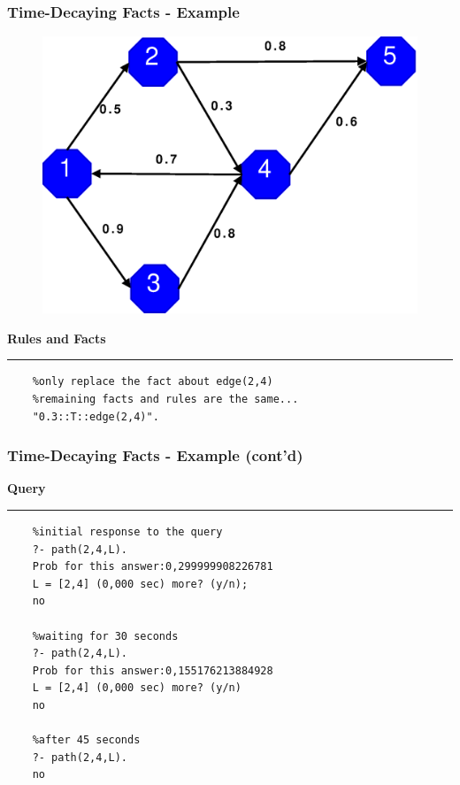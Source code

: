\documentclass{beamer}
\newenvironment{mylisting}
{\begin{list}{}{\setlength{\leftmargin}{1em}}\item\scriptsize\bfseries}
{\end{list}}
\begin{document}
\begin{frame}[fragile]
	\frametitle{Time-Decaying Facts - Example}
	\begin{figure}[ht]
	\begin{center}
	\includegraphics[height=.3\paperheight]{../img/graph.eps}
	\end{center}
	\end{figure}
	\begin{mylisting}
	Rules and Facts
	\vspace*{2px}\hrule
	\begin{verbatim}
	%only replace the fact about edge(2,4)
	%remaining facts and rules are the same...
	"0.3::T::edge(2,4)".
	\end{verbatim}
	\end{mylisting}
	
\end{frame}

\begin{frame}[fragile]
	\frametitle{Time-Decaying Facts - Example (cont'd)}
	\begin{mylisting}
	Query
	\vspace*{2px}\hrule
	\begin{verbatim}
	%initial response to the query
	?- path(2,4,L).
	Prob for this answer:0,299999908226781
	L = [2,4] (0,000 sec) more? (y/n);
	no
	
	%waiting for 30 seconds
	?- path(2,4,L).
	Prob for this answer:0,155176213884928
	L = [2,4] (0,000 sec) more? (y/n)
	no
	
	%after 45 seconds
	?- path(2,4,L).
	no
	\end{verbatim}
	\end{mylisting}
\end{frame}
\end{document}
